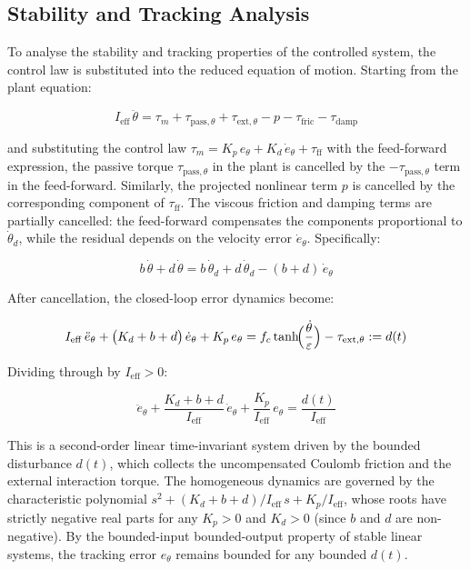 \subsection{Stability and Tracking Analysis}
To analyse the stability and tracking properties of the controlled system, the control law is substituted into the reduced equation of motion. Starting from the plant equation:

\begin{equation}
    I_{\mathrm{eff}}\,\ddot\theta
  = \tau_m + \tau_{\mathrm{pass},\theta} + \tau_{\mathrm{ext},\theta}
    - p - \tau_{\mathrm{fric}} - \tau_{\mathrm{damp}}
\end{equation}

and substituting the control law $\tau_m = K_p\,e_\theta + K_d\,\dot e_\theta + \tau_{\mathrm{ff}}$ with the feed-forward expression, the passive torque $\tau_{\mathrm{pass},\theta}$ in the plant is cancelled by the $-\tau_{\mathrm{pass},\theta}$ term in the feed-forward. Similarly, the projected nonlinear term $p$ is cancelled by the corresponding component of $\tau_{\mathrm{ff}}$. The viscous friction and damping terms are partially cancelled: the feed-forward compensates the components proportional to $\dot\theta_d$, while the residual depends on the velocity error $\dot e_\theta$. Specifically:

\begin{equation}
    b\,\dot\theta + d\,\dot\theta = b\,\dot\theta_d + d\,\dot\theta_d - (b + d)\,\dot e_\theta
\end{equation}

After cancellation, the closed-loop error dynamics become:

\begin{equation}
    I_{\mathrm{eff}}\,\ddot e_\theta + \bigl(K_d + b + d\bigr)\,\dot e_\theta + K_p\,e_\theta
  = f_c\tanh\!\Bigl(\frac{\dot\theta}{\varepsilon}\Bigr) - \tau_{\mathrm{ext},\theta}
  := d(t)
\end{equation}

Dividing through by $I_{\mathrm{eff}} > 0$:

\begin{equation}
    \ddot e_\theta + \frac{K_d + b + d}{I_{\mathrm{eff}}}\,\dot e_\theta + \frac{K_p}{I_{\mathrm{eff}}}\,e_\theta
  = \frac{d(t)}{I_{\mathrm{eff}}}
\end{equation}

This is a second-order linear time-invariant system driven by the bounded disturbance $d(t)$, which collects the uncompensated Coulomb friction and the external interaction torque. The homogeneous dynamics are governed by the characteristic polynomial $s^2 + (K_d + b + d)/I_{\mathrm{eff}}\,s + K_p/I_{\mathrm{eff}}$, whose roots have strictly negative real parts for any $K_p > 0$ and $K_d > 0$ (since $b$ and $d$ are non-negative). By the bounded-input bounded-output property of stable linear systems, the tracking error $e_\theta$ remains bounded for any bounded $d(t)$.
 

